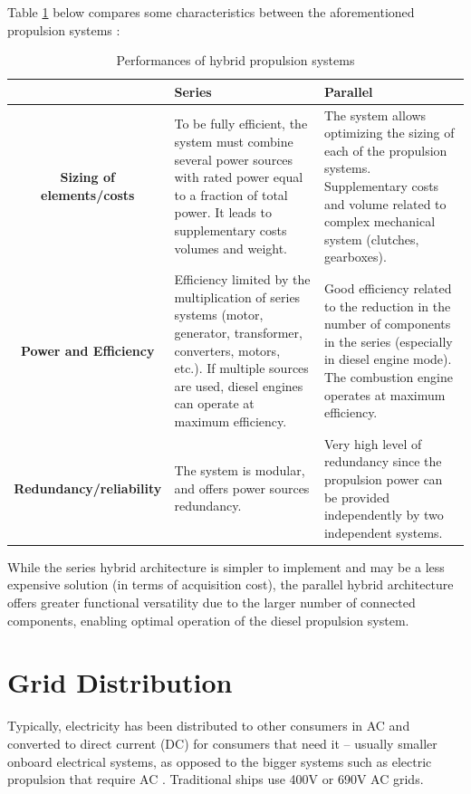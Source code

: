 Table \ref{tab:Series_Parallel_hybrid} below compares some characteristics between the aforementioned propulsion systems :

\begin{table}[H]
	\centering
	\caption{Performances of hybrid propulsion systems \cite{Bennabi}}
	\label{tab:Series_Parallel_hybrid}
	\begin{tabular}{|c|p{50mm}|p{50mm}|}
		\hline      
		&\textbf{Series}&\textbf{Parallel}\\		
\hline \hline
		\textbf{Sizing of elements/costs}&  To be fully efficient, the system must combine several power sources with rated power equal to a fraction of total power. It leads to supplementary costs volumes and weight.
		
		 & The system allows optimizing the sizing of each of the propulsion systems. Supplementary costs and volume related to complex mechanical system (clutches, gearboxes).\\
		\hline
		\textbf{Power and Efficiency}& Efficiency limited by the multiplication of series systems (motor, generator, transformer, converters, motors, etc.). If multiple sources are used, diesel engines can operate at maximum efficiency.  
		& Good efficiency related to the reduction in the number of components in the series (especially in diesel engine mode). The combustion engine operates at maximum efficiency.\\
		\hline
		\textbf{Redundancy/reliability}& The system is modular, and offers power sources redundancy. 
		& Very high level of redundancy since the propulsion power can be provided independently by two independent systems.\\	
		\hline \hline
	\end{tabular}
\end{table}

While the series hybrid architecture is simpler to implement and may be a less expensive solution (in terms of acquisition cost), the parallel hybrid architecture offers greater functional versatility due to the larger number of connected components, enabling optimal operation of the diesel propulsion system.


\section{Grid Distribution}

Typically, electricity has been distributed to other consumers in AC and converted to direct current (DC) for consumers that need it – usually smaller onboard electrical systems, as opposed to the bigger systems such as electric propulsion that require AC \cite{Wartsila2}. Traditional ships use 400V or 690V AC grids. 

